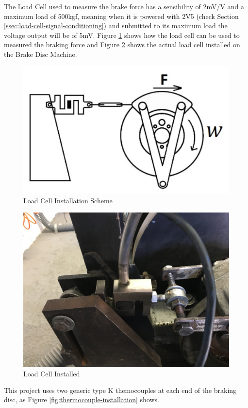 		The Load Cell used to measure the brake force has a sensibility of 2mV/V and a maximum load of 500kgf, meaning when it is powered with 2V5 (check Section \ref{ssec:load-cell-signal-conditioning}) and submitted to its maximum load the voltage output will be of 5mV. Figure \ref{fig:load-cell-installation-scheme} shows how the load cell can be used to measured the braking force and Figure \ref{fig:load-cell-installed} shows the actual load cell installed on the Brake Disc Machine.

		\begin{figure}[htbp]
			\centering
			\includegraphics[width=.5\textwidth]{figuras/fig-load-cell-installation-scheme}
			\caption{Load Cell Installation Scheme \cite{caixeta2017}}
			\label{fig:load-cell-installation-scheme}
		\end{figure}

		\begin{figure}[htbp]
			\centering
			\includegraphics[width=.5\textwidth]{figuras/fig-load-cell-installed}
			\caption{Load Cell Installed}
			\label{fig:load-cell-installed}
		\end{figure}
		\par

		This project uses two generic type K themocouples at each end of the braking disc, as Figure \ref{fig:thermocouple-installation} shows.

